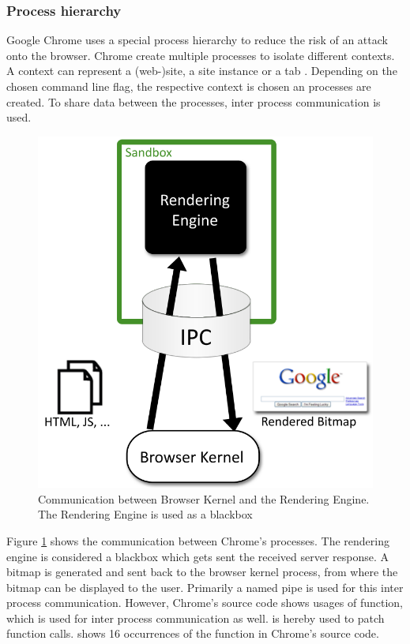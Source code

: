 \subsubsection{Process hierarchy}
Google Chrome uses a special process hierarchy to reduce the risk of an attack onto the browser. Chrome create multiple processes to isolate different contexts. A context can represent a (web-)site, a site instance or a tab \cite{chromium_process_models}. Depending on the chosen command line flag, the respective context is chosen an processes are created. To share data between the processes, inter process communication is used.
\begin{figure}[!htbp]
\centering
\includegraphics[scale=0.5]{sections/background/chrome/communication.png}
\caption{Communication between Browser Kernel and the Rendering Engine. The Rendering Engine is used as a blackbox \cite{chromium_security_architecture}}
\label{fig:chrome_communication}
\end{figure}
Figure \ref{fig:chrome_communication} shows the communication between Chrome's processes. The rendering engine is considered a blackbox which gets sent the received server response. A bitmap is generated and sent back to the browser kernel process, from where the bitmap can be displayed to the user. Primarily a named pipe \cite{chromium_security_architecture} is used for this inter process communication. However, Chrome's source code shows usages of  function, which is used for inter process communication as well.  is hereby used to patch function calls. \cite{chromium_source_writeprocessmemory} shows 16 occurrences of the  function in Chrome's source code.